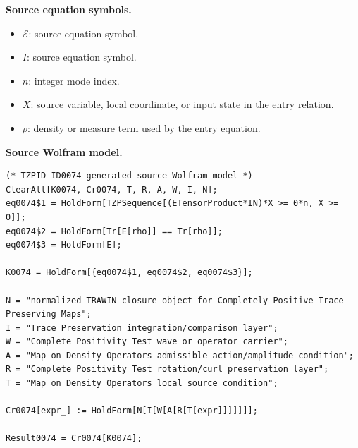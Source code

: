\begin{minipage}[t]{0.49\linewidth}
\begingroup
\small
\raggedright
\textbf{Source equation symbols.}\par
\begin{itemize}[leftmargin=1.35em,itemsep=1pt,topsep=1pt,parsep=0pt]
    \item $\mathcal{E}$: source equation symbol.
    \item $I$: source equation symbol.
    \item $n$: integer mode index.
    \item $X$: source variable, local coordinate, or input state in the entry relation.
    \item $\rho$: density or measure term used by the entry equation.
\end{itemize}
\endgroup
\end{minipage}\hfill
\begin{minipage}[t]{0.47\linewidth}
\begingroup
\scriptsize
\raggedright
\textbf{Source Wolfram model.}\par
\begin{Verbatim}[fontsize=\tiny,breaklines=true,breakanywhere=true]
(* TZPID ID0074 generated source Wolfram model *)
ClearAll[K0074, Cr0074, T, R, A, W, I, N];
eq0074$1 = HoldForm[TZPSequence[(ETensorProduct*IN)*X >= 0*n, X >= 0]];
eq0074$2 = HoldForm[Tr[E[rho]] == Tr[rho]];
eq0074$3 = HoldForm[E];

K0074 = HoldForm[{eq0074$1, eq0074$2, eq0074$3}];

N = "normalized TRAWIN closure object for Completely Positive Trace-Preserving Maps";
I = "Trace Preservation integration/comparison layer";
W = "Complete Positivity Test wave or operator carrier";
A = "Map on Density Operators admissible action/amplitude condition";
R = "Complete Positivity Test rotation/curl preservation layer";
T = "Map on Density Operators local source condition";

Cr0074[expr_] := HoldForm[N[I[W[A[R[T[expr]]]]]]];

Result0074 = Cr0074[K0074];
\end{Verbatim}
\endgroup
\end{minipage}

